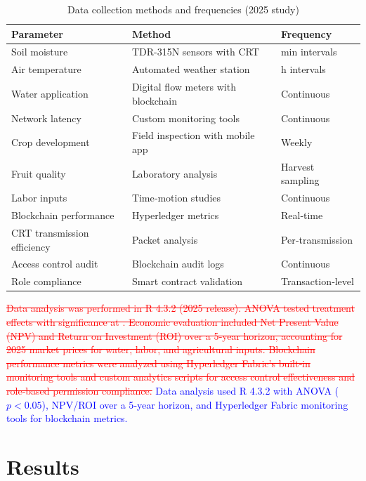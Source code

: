 \documentclass[pdflatex,sn-mathphys-num]{sn-jnl}
\theoremstyle{thmstyleone}
\theoremstyle{thmstyletwo}
\theoremstyle{thmstylethree}
\begin{document}
{\begin{table}[htbp]
\centering
\caption{Data collection methods and frequencies (2025 study)}
\label{tab:data-collection}
\footnotesize
\begin{tabularx}{\columnwidth}{
    >{\raggedright\arraybackslash}p{}
    >{\raggedright\arraybackslash}p{}
    >{\centering\arraybackslash}p{}
}
\toprule
\textbf{Parameter} & \textbf{Method} & \textbf{Frequency} \\
\midrule
Soil moisture & TDR-315N sensors with CRT & 30 min intervals \\
Air temperature & Automated weather station & 1 h intervals \\
Water application & Digital flow meters with blockchain & Continuous \\
Network latency & Custom monitoring tools & Continuous \\
Crop development & Field inspection with mobile app & Weekly \\
Fruit quality & Laboratory analysis & Harvest sampling \\
Labor inputs & Time‑motion studies & Continuous \\
Blockchain performance & Hyperledger metrics & Real‑time \\
CRT transmission efficiency & Packet analysis & Per‑transmission \\
Access control audit & Blockchain audit logs & Continuous \\
Role compliance & Smart contract validation & Transaction‑level \\
\bottomrule
\end{tabularx}
\end{table}

\textcolor{red}{\sout{Data analysis was performed in R 4.3.2 (2025 release). ANOVA tested treatment effects with significance at . Economic evaluation included Net Present Value (NPV) and Return on Investment (ROI) over a 5‑year horizon, accounting for 2025 market prices for water, labor, and agricultural inputs. Blockchain performance metrics were analyzed using Hyperledger Fabric's built‑in monitoring tools and custom analytics scripts for access control effectiveness and role‑based permission compliance.}}
\textcolor{blue}{Data analysis used R 4.3.2 with ANOVA ($p < 0.05$), NPV/ROI over a 5‑year horizon, and Hyperledger Fabric monitoring tools for blockchain metrics.}

\section{Results}
\label{sec:results}

}
\end{document}
